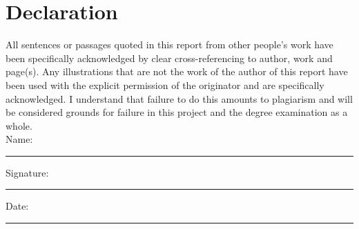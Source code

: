 \documentclass[11pt,oneside]{book}
\begin{document}
\frontmatter



\newpage
\chapter*{\Large Declaration}


All sentences or passages quoted in this report from other people's work have been specifically acknowledged by clear cross-referencing to author, work and page(s). Any illustrations that are not the work of the author of this report have been used with the explicit permission of the originator and are specifically acknowledged. I understand that failure to do this amounts to plagiarism and will be considered grounds for failure in this project and the degree examination as a whole.\\[1cm]

\noindent Name:\\[1mm]
\rule[1em]{25em}{0.5pt}

\noindent Signature:\\[1mm]
\rule[1em]{25em}{0.5pt}

\noindent Date:\\[1mm]
\rule[1em]{25em}{0.5pt}

%


\tableofcontents


\mainmatter





\renewcommand{\bibname}{References}
 
 
\end{document}
